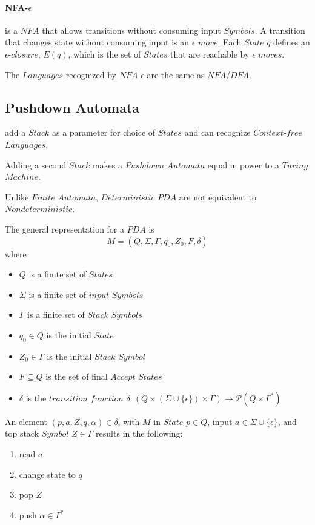 \documentclass{article}
\begin{document}
\paragraph{NFA-$\epsilon$} is a $NFA$ that allows transitions
without consuming input $Symbols$. A transition that changes state
without consuming input is an $\epsilon$ $move$. Each $State$ $q$
defines an $\epsilon$-$closure$, $E(q)$, which is the set of $States$
that are reachable by $\epsilon$ $moves$.

The $Languages$ recognized by $NFA$-$\epsilon$ are the same as
$NFA$/$DFA$.

\subsection{Pushdown Automata} add a $Stack$ as a parameter for
choice of $States$ and can recognize $Context$-$free$ $Languages$.

Adding a second $Stack$ makes a $Pushdown$ $Automata$ equal in power
to a $Turing$ $Machine$.

Unlike $Finite$ $Automata$, $Deterministic$ $PDA$ are not equivalent
to $Nondeterministic$.

The general representation for a $PDA$ is
\[
    M = (Q, \Sigma, \Gamma, q_0, Z_0, F, \delta)
\]
where
\begin{itemize}
\item $Q$ is a finite set of $States$
\item $\Sigma$ is a finite set of $input$ $Symbols$
\item $\Gamma$ is a finite set of $Stack$ $Symbols$
\item $q_0 \in Q$ is the initial $State$
\item $Z_0 \in \Gamma$ is the initial $Stack$ $Symbol$
\item $F \subseteq Q$ is the set of final $Accept$ $States$
\item $\delta$ is the $transition$ $function$ $\delta:
(Q \times (\Sigma \cup \{\epsilon\}) \times \Gamma) \rightarrow
\mathcal{P}(Q \times \Gamma^*)$
\end{itemize}

An element $(p,a,Z,q,\alpha)\in\delta$, with $M$ in $State$ $p \in Q$,
input $a \in \Sigma \cup \{\epsilon\}$, and top stack $Symbol$ $Z \in
\Gamma$ results in the following:
\begin{enumerate}
\item read $a$
\item change state to $q$
\item pop $Z$
\item push $\alpha \in \Gamma^*$
\end{enumerate}
\end{document}

